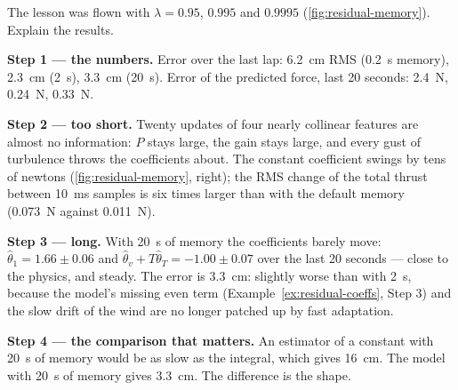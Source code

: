 \begin{example}
\label{ex:residual-lambda}
The lesson was flown with $\lambda = 0.95$, $0.995$ and $0.9995$ (\cref{fig:residual-memory}). Explain the results.

\textbf{Step 1 — the numbers.} Error over the last lap: \SI{6.2}{cm} RMS (\SI{0.2}{s} memory), \SI{2.3}{cm} (\SI{2}{s}), \SI{3.3}{cm} (\SI{20}{s}). Error of the predicted force, last 20 seconds: \SI{2.4}{N}, \SI{0.24}{N}, \SI{0.33}{N}.

\textbf{Step 2 — too short.} Twenty updates of four nearly collinear features are almost no information: $P$ stays large, the gain stays large, and every gust of turbulence throws the coefficients about. The constant coefficient swings by tens of newtons (\cref{fig:residual-memory}, right); the RMS change of the total thrust between \SI{10}{ms} samples is six times larger than with the default memory (\SI{0.073}{N} against \SI{0.011}{N}).

\textbf{Step 3 — long.} With \SI{20}{s} of memory the coefficients barely move: $\hat\theta_1 = 1.66 \pm 0.06$ and $\hat\theta_v + T\hat\theta_T = -1.00 \pm 0.07$ over the last 20 seconds — close to the physics, and steady. The error is \SI{3.3}{cm}: slightly worse than with \SI{2}{s}, because the model's missing even term (Example~\ref{ex:residual-coeffs}, Step 3) and the slow drift of the wind are no longer patched up by fast adaptation.

\textbf{Step 4 — the comparison that matters.} An estimator of a constant with \SI{20}{s} of memory would be as slow as the integral, which gives \SI{16}{cm}. The model with \SI{20}{s} of memory gives \SI{3.3}{cm}. The difference is the shape.
\end{example}


